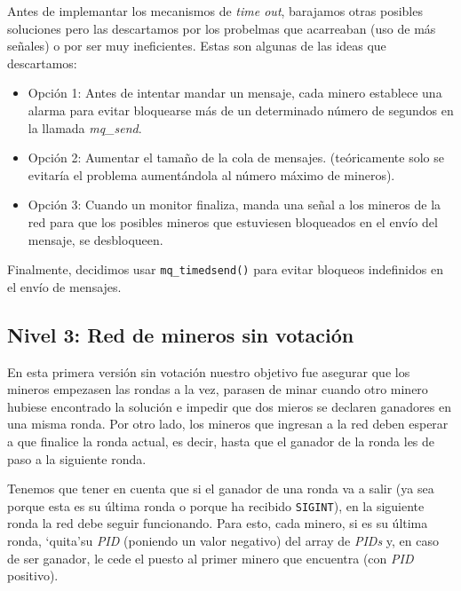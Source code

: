 \documentclass{article}
\begin{document}
    
 

    Antes de implemantar los mecanismos de \textit{time out}, barajamos otras posibles soluciones pero las descartamos por los probelmas que acarreaban (uso de más señales) o por ser muy ineficientes. Estas son algunas de las ideas que descartamos:

    \begin{itemize}
        \item Opción 1: Antes de intentar mandar un mensaje, cada minero establece una alarma para evitar bloquearse más de un determinado número de segundos en la llamada \textit{mq\_send}.
        \item Opción 2: Aumentar el tamaño de la cola de mensajes. (teóricamente solo se evitaría el problema aumentándola al número máximo de mineros).
        \item Opción 3: Cuando un monitor finaliza, manda una señal a los mineros de la red para que los posibles mineros que estuviesen bloqueados en el envío del mensaje, se desbloqueen. 
    \end{itemize}

    Finalmente, decidimos usar \texttt{mq\_timedsend()} para evitar bloqueos indefinidos en el envío de mensajes.

\subsection*{Nivel 3: Red de mineros sin votación}

En esta primera versión sin votación nuestro objetivo fue asegurar que los mineros empezasen las rondas a la vez, parasen de minar cuando otro minero hubiese encontrado la solución e impedir que dos mieros se declaren ganadores en una misma ronda. Por otro lado, los mineros que ingresan a la red deben esperar a que finalice la ronda actual, es decir, hasta que el ganador de la ronda les de paso a la siguiente ronda.

Tenemos que tener en cuenta que si el ganador de una ronda  va a salir (ya sea porque esta es su última ronda o porque ha recibido \texttt{SIGINT}), en la siguiente ronda la red debe seguir funcionando. Para esto, cada minero, si es su última ronda, `quita'\footnotemark \space su \textit{PID} (poniendo un valor negativo) del array de \textit{PIDs} y, en caso de ser ganador, le cede el puesto al primer minero que encuentra (con \emph{PID} positivo).
\end{document}
